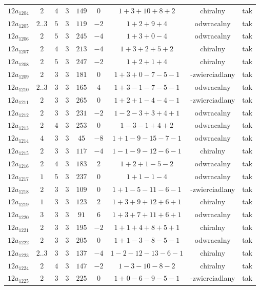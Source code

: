 \begin{longtable}{ccccccccc}
$12a_{1204}$ & $2$ & $4$ & $3$ & $149$ & $0$ & $1+3+10+8+2$ & chiralny & tak \\
$12a_{1205}$ & $2..3$ & $5$ & $3$ & $119$ & $-2$ & $1+2+9+4$ & odwracalny & tak \\
$12a_{1206}$ & $2$ & $5$ & $3$ & $245$ & $-4$ & $1+3+0-4$ & odwracalny & tak \\
$12a_{1207}$ & $2$ & $4$ & $3$ & $213$ & $-4$ & $1+3+2+5+2$ & chiralny & tak \\
$12a_{1208}$ & $2$ & $5$ & $3$ & $247$ & $-2$ & $1+2+1+4$ & chiralny & tak \\
$12a_{1209}$ & $2$ & $3$ & $3$ & $181$ & $0$ & $1+3+0-7-5-1$ & -zwierciadlany & tak \\
$12a_{1210}$ & $2..3$ & $3$ & $3$ & $165$ & $4$ & $1+3-1-7-5-1$ & odwracalny & tak \\
$12a_{1211}$ & $2$ & $3$ & $3$ & $265$ & $0$ & $1+2+1-4-4-1$ & -zwierciadlany & tak \\
$12a_{1212}$ & $2$ & $3$ & $3$ & $231$ & $-2$ & $1-2-3+3+4+1$ & odwracalny & tak \\
$12a_{1213}$ & $2$ & $4$ & $3$ & $253$ & $0$ & $1-3-1+4+2$ & odwracalny & tak \\
$12a_{1214}$ & $4$ & $3$ & $3$ & $45$ & $-8$ & $1+1-9-15-7-1$ & odwracalny & tak \\
$12a_{1215}$ & $2$ & $3$ & $3$ & $117$ & $-4$ & $1-1-9-12-6-1$ & chiralny & tak \\
$12a_{1216}$ & $2$ & $4$ & $3$ & $183$ & $2$ & $1+2+1-5-2$ & odwracalny & tak \\
$12a_{1217}$ & $1$ & $5$ & $3$ & $237$ & $0$ & $1+1-1-4$ & odwracalny & tak \\
$12a_{1218}$ & $2$ & $3$ & $3$ & $109$ & $0$ & $1+1-5-11-6-1$ & -zwierciadlany & tak \\
$12a_{1219}$ & $1$ & $3$ & $3$ & $123$ & $2$ & $1+3+9+12+6+1$ & chiralny & tak \\
$12a_{1220}$ & $3$ & $3$ & $3$ & $91$ & $6$ & $1+3+7+11+6+1$ & odwracalny & tak \\
$12a_{1221}$ & $2$ & $3$ & $3$ & $195$ & $-2$ & $1+1+4+8+5+1$ & chiralny & tak \\
$12a_{1222}$ & $2$ & $3$ & $3$ & $205$ & $0$ & $1+1-3-8-5-1$ & odwracalny & tak \\
$12a_{1223}$ & $2..3$ & $3$ & $3$ & $137$ & $-4$ & $1-2-12-13-6-1$ & chiralny & tak \\
$12a_{1224}$ & $2$ & $4$ & $3$ & $147$ & $-2$ & $1-3-10-8-2$ & chiralny & tak \\
$12a_{1225}$ & $2$ & $3$ & $3$ & $225$ & $0$ & $1+0-6-9-5-1$ & -zwierciadlany & tak \\

\end{longtable}
